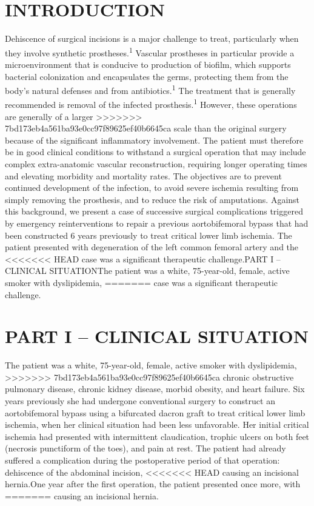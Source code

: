 \documentclass[numberinsection,times,10pt,spreadimages]{memoir}
\begin{document}
\section{INTRODUCTION}

Dehiscence of surgical incisions is a major challenge to treat, particularly
when
they involve synthetic prostheses.\textsuperscript{1}
Vascular prostheses in particular provide a
microenvironment that is conducive to production of biofilm, which supports
bacterial colonization and encapsulates the germs, protecting them from the
body’s natural defenses and from antibiotics.\textsuperscript{1}
The treatment that is generally recommended is
removal of the infected prosthesis.\textsuperscript{1}
However, these operations are generally of a larger
>>>>>>> 7bd173eb4a561ba93e0cc97f89625ef40b6645ca
scale than the original surgery because of the significant inflammatory
involvement. The patient must therefore be in good clinical conditions to
withstand a surgical operation that may include complex extra-anatomic vascular
reconstruction, requiring longer operating times and elevating morbidity and
mortality rates. The objectives are to prevent continued development of the
infection, to avoid severe ischemia resulting from simply removing the
prosthesis, and to reduce the risk of amputations. Against this background, we
present a case of successive surgical complications triggered by emergency
reinterventions to repair a previous aortobifemoral bypass that had been
constructed 6 years previously to treat critical lower limb ischemia. The
patient presented with degeneration of the left common femoral artery and the
<<<<<<< HEAD
case was a significant therapeutic challenge.PART I – CLINICAL SITUATIONThe
patient was a white, 75-year-old, female, active smoker with dyslipidemia,
=======
case was a significant therapeutic challenge.

\section{PART I – CLINICAL SITUATION}

The patient was a white, 75-year-old, female, active smoker with dyslipidemia,
>>>>>>> 7bd173eb4a561ba93e0cc97f89625ef40b6645ca
chronic obstructive pulmonary disease, chronic kidney disease, morbid obesity,
and heart failure. Six years previously she had undergone conventional surgery
to construct an aortobifemoral bypass using a bifurcated dacron graft to treat
critical lower limb ischemia, when her clinical situation had been less
unfavorable. Her initial critical ischemia had presented with intermittent
claudication, trophic ulcers on both feet (necrosis punctiform of the toes), and
pain at rest. The patient had already suffered a complication during the
postoperative period of that operation: dehiscence of the abdominal incision,
<<<<<<< HEAD
causing an incisional hernia.One year after the first operation, the patient
presented once more, with
=======
causing an incisional hernia.
\end{document}

